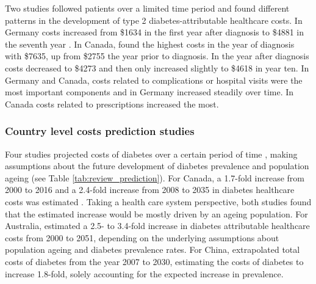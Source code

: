 Two studies followed patients over a limited time period and found different patterns in the development of type 2 diabetes-attributable healthcare costs. In Germany costs increased from  \$1634 in the first year after diagnosis to \$4881 in the seventh year \parencite{Martin2007b}. In Canada, \textcite{Johnson2006d} found the highest costs in the year of diagnosis with \$7635, up from \$2755 the year prior to diagnosis. In the year after diagnosis costs decreased to \$4273 and then only increased slightly to \$4618 in year ten. In Germany and Canada, costs related to complications or hospital visits were the most important components and in Germany increased steadily over time. In Canada costs related to prescriptions increased the most.

\subsubsection*{Country level costs prediction studies}
Four studies projected costs of diabetes over a certain period of time \parencite{Ohinmaa2004,Lau2011a,Davis2006b,Wang2009f}, making assumptions about the future development of diabetes prevalence and population ageing (see Table \ref{tab:review_prediction}). For Canada, a 1.7-fold increase from 2000 to 2016 \parencite{Ohinmaa2004} and a 2.4-fold increase from 2008 to 2035 in diabetes healthcare costs was estimated \parencite{Lau2011a}. Taking a health care system perspective, both studies found that the estimated increase would be mostly driven by an ageing population. For Australia, \textcite{Davis2006b} estimated a 2.5- to 3.4-fold increase in diabetes attributable healthcare costs from 2000 to 2051, depending on the underlying assumptions about population ageing and diabetes prevalence rates. For China, \textcite{Wang2009f} extrapolated total costs of diabetes from the year 2007 to 2030, estimating the costs of diabetes to increase 1.8-fold, solely accounting for the expected increase in prevalence.

